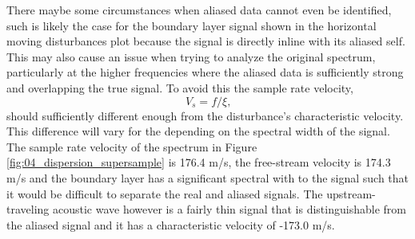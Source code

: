 There maybe some circumstances when aliased data cannot even be identified, such is likely the case for the boundary layer signal shown in the horizontal moving disturbances plot because the signal is directly inline with its aliased self.
This may also cause an issue when trying to analyze the original spectrum, particularly at the higher frequencies where the aliased data is sufficiently strong and overlapping the true signal.
To avoid this the sample rate velocity,
\begin{equation}
  V_s=f/\xi \textrm{,}
\end{equation}
should sufficiently different enough from the disturbance's characteristic velocity.
This difference will vary for the depending on the spectral width of the signal.
The sample rate velocity of the spectrum in Figure \ref{fig:04_dispersion_supersample} is 176.4 m/s, the free-stream velocity is 174.3 m/s and the boundary layer has a significant spectral with to the signal such that it would be difficult to separate the real and aliased signals.
The upstream-traveling acoustic wave however is a fairly thin signal that is distinguishable from the aliased signal and it has a characteristic velocity of -173.0 m/s.


